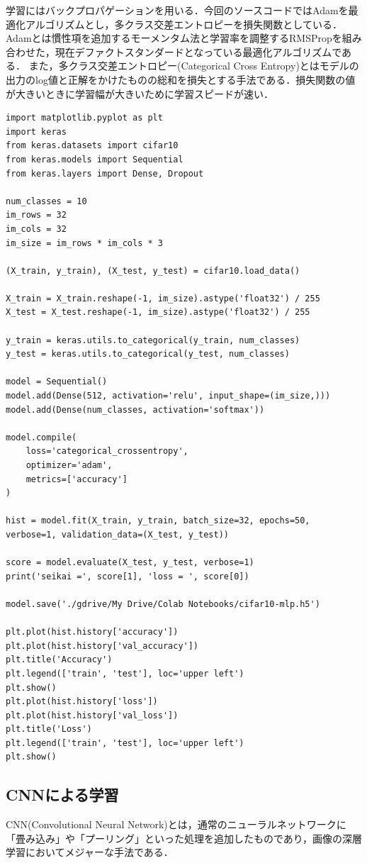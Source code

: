 \documentclass[a4paper, titlepage]{jsarticle}
\begin{document}
	学習にはバックプロパゲーションを用いる．今回のソースコードではAdamを最適化アルゴリズムとし，多クラス交差エントロピーを損失関数としている．
	Adamとは慣性項を追加するモーメンタム法と学習率を調整するRMSPropを組み合わせた，現在デファクトスタンダードとなっている最適化アルゴリズムである．
	また，多クラス交差エントロピー(Categorical Cross Entropy)とはモデルの出力のlog値と正解をかけたものの総和を損失とする手法である．損失関数の値が大きいときに学習幅が大きいために学習スピードが速い．

	\begin{lstlisting}
import matplotlib.pyplot as plt
import keras
from keras.datasets import cifar10
from keras.models import Sequential
from keras.layers import Dense, Dropout

num_classes = 10
im_rows = 32
im_cols = 32
im_size = im_rows * im_cols * 3

(X_train, y_train), (X_test, y_test) = cifar10.load_data()

X_train = X_train.reshape(-1, im_size).astype('float32') / 255
X_test = X_test.reshape(-1, im_size).astype('float32') / 255

y_train = keras.utils.to_categorical(y_train, num_classes)
y_test = keras.utils.to_categorical(y_test, num_classes)

model = Sequential()
model.add(Dense(512, activation='relu', input_shape=(im_size,)))
model.add(Dense(num_classes, activation='softmax'))

model.compile(
    loss='categorical_crossentropy',
    optimizer='adam',
    metrics=['accuracy']
)

hist = model.fit(X_train, y_train, batch_size=32, epochs=50, verbose=1, validation_data=(X_test, y_test))

score = model.evaluate(X_test, y_test, verbose=1)
print('seikai =', score[1], 'loss = ', score[0])

model.save('./gdrive/My Drive/Colab Notebooks/cifar10-mlp.h5')

plt.plot(hist.history['accuracy'])
plt.plot(hist.history['val_accuracy'])
plt.title('Accuracy')
plt.legend(['train', 'test'], loc='upper left')
plt.show()
plt.plot(hist.history['loss'])
plt.plot(hist.history['val_loss'])
plt.title('Loss')
plt.legend(['train', 'test'], loc='upper left')
plt.show()	
	\end{lstlisting}

	\subsection{CNNによる学習}
	CNN(Convolutional Neural Network)とは，通常のニューラルネットワークに「畳み込み」や「プーリング」といった処理を追加したものであり，画像の深層学習においてメジャーな手法である．
\end{document}
